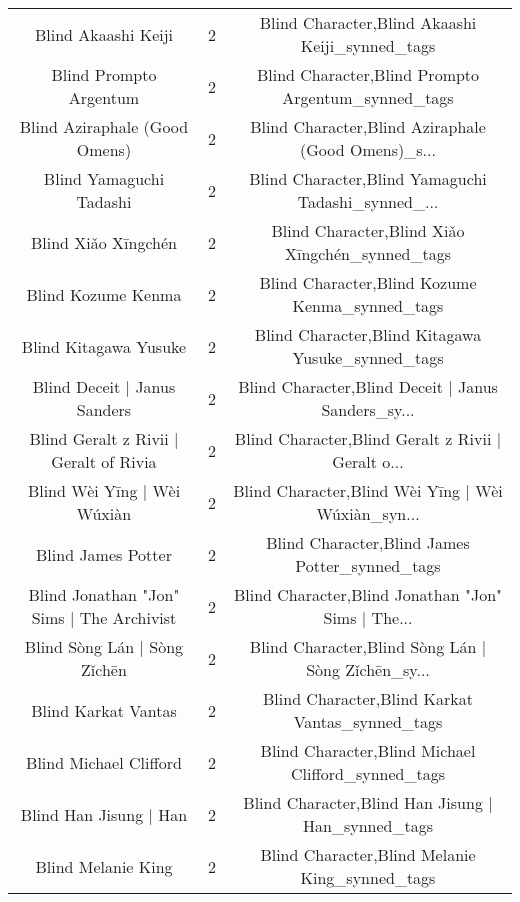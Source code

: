 \begin{table}[h!]
{\begin{tabular}{|c|c|c|}
                               Blind Akaashi Keiji &          2 &    Blind Character,Blind Akaashi Keiji\_synned\_tags \\
                            Blind Prompto Argentum &          2 & Blind Character,Blind Prompto Argentum\_synned\_tags \\
                     Blind Aziraphale (Good Omens) &          2 & Blind Character,Blind Aziraphale (Good Omens)\_s... \\
                           Blind Yamaguchi Tadashi &          2 & Blind Character,Blind Yamaguchi Tadashi\_synned\_... \\
                               Blind Xiǎo Xīngchén &          2 &    Blind Character,Blind Xiǎo Xīngchén\_synned\_tags \\
                                Blind Kozume Kenma &          2 &     Blind Character,Blind Kozume Kenma\_synned\_tags \\
                             Blind Kitagawa Yusuke &          2 &  Blind Character,Blind Kitagawa Yusuke\_synned\_tags \\
                      Blind Deceit | Janus Sanders &          2 & Blind Character,Blind Deceit | Janus Sanders\_sy... \\
            Blind Geralt z Rivii | Geralt of Rivia &          2 & Blind Character,Blind Geralt z Rivii | Geralt o... \\
                       Blind Wèi Yīng | Wèi Wúxiàn &          2 & Blind Character,Blind Wèi Yīng | Wèi Wúxiàn\_syn... \\
                                Blind James Potter &          2 &     Blind Character,Blind James Potter\_synned\_tags \\
         Blind Jonathan "Jon" Sims | The Archivist &          2 & Blind Character,Blind Jonathan "Jon" Sims | The... \\
                      Blind Sòng Lán | Sòng Zǐchēn &          2 & Blind Character,Blind Sòng Lán | Sòng Zǐchēn\_sy... \\
                               Blind Karkat Vantas &          2 &    Blind Character,Blind Karkat Vantas\_synned\_tags \\
                            Blind Michael Clifford &          2 & Blind Character,Blind Michael Clifford\_synned\_tags \\
                            Blind Han Jisung | Han &          2 & Blind Character,Blind Han Jisung | Han\_synned\_tags \\
                                Blind Melanie King &          2 &     Blind Character,Blind Melanie King\_synned\_tags \\

\end{tabular}}
\end{table}

